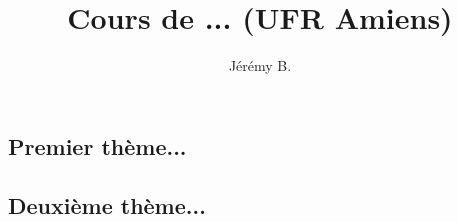 ﻿\documentclass[12pt, a4paper, openany]{book}
\author{Jérémy B.}
\date{}
\title{Cours de ... (UFR Amiens)}
\begin{document}
\maketitle

\chapter{}

\section{Premier thème...}


\section{Deuxième thème...}
\end{document}
